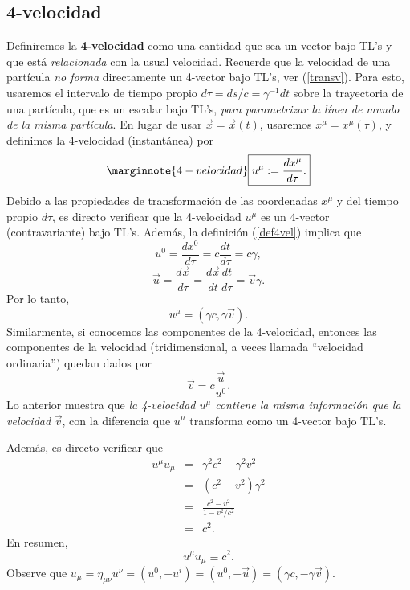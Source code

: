 \subsection{4-velocidad}
Definiremos la \textbf{4-velocidad} como una cantidad que sea un vector bajo
TL's y que está \textit{relacionada} con la usual velocidad. Recuerde que la velocidad de una partícula \textit{no forma} directamente un 4-vector bajo TL's, ver (\ref{transv}).
Para esto, usaremos el intervalo de tiempo propio $d\tau={ds}/{c}=\gamma^{-1}dt$ sobre la trayectoria de una partícula, que es un escalar bajo TL's, \textit{para parametrizar la línea de mundo de la misma partícula}. En lugar de usar $\vec{x}=\vec{x}(t)$, usaremos $x^\mu=x^\mu(\tau)$, y definimos la 4-velocidad (instantánea) por
\begin{equation}\marginnote{4-velocidad}
\boxed{u^\mu :=\frac{dx^\mu }{d\tau}. \label{def4vel}}
\end{equation}
Debido a las propiedades de transformación de las coordenadas $x^\mu$ y del
tiempo propio $d\tau$, es directo verificar que la 4-velocidad $u^\mu$ es un
4-vector (contravariante) bajo TL's. Además, la definición
(\ref{def4vel}) implica que
\begin{equation}
u^0=\frac{dx^0}{d\tau}=c\frac{dt}{d\tau}=c\gamma,
\end{equation}
\begin{equation}
\vec{u}=\frac{d\vec{x}}{d\tau}=\frac{d\vec{x}}{dt}\frac{dt}{d\tau}=
\vec{v}\gamma.
\end{equation}
Por lo tanto,
\begin{equation}
\boxed{u^\mu =(\gamma c, \gamma\vec{v}). \label{comp4vel}}
\end{equation}
Similarmente, si conocemos las componentes de la 4-velocidad, entonces las
componentes de la velocidad (tridimensional, a veces llamada ``velocidad
ordinaria'') quedan dados por
\begin{equation}
\vec{v}=c\frac{\vec{u}}{u^0}.
\end{equation}
Lo anterior muestra que \textit{la 4-velocidad $u^\mu$ contiene la misma información que la velocidad} $\vec{v}$, con la diferencia que $u^\mu$ transforma como un 4-vector bajo TL's.

Además, es directo verificar que
\begin{eqnarray}
u^\mu u_\mu &=&\gamma^ 2c^2-\gamma^2 v^2\\
&=&(c^2-v^2)\gamma^2\\
&=&\frac{c^2-v^2}{1-v^2/c^2}\\
&=&c^2.
\end{eqnarray}
En resumen,
\begin{equation}
\boxed{u^\mu u_\mu \equiv c^2. \label{uuc2}}
\end{equation}
Observe que $u_\mu=\eta_{\mu\nu}u^\nu=(u^0,-u^i)=(u^0,-\vec{u})=(\gamma
c,-\gamma \vec{v})$.


